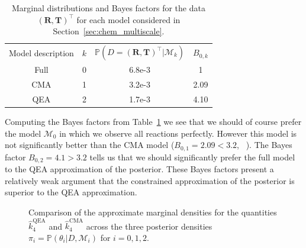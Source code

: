 \documentclass[final]{siamltex}
\begin{document}
\begin{table}[!htb]
\centering
\begin{tabular}{cccc}
	\toprule
	Model description & $k$ & \quad $\mathbb{P}(D =
                                  (\mathbf{R},\mathbf{T})^\top|\mathcal{M}_k)$
  & $B_{0,k}$ \\ \cmidrule(lr){1-4}
	Full & 0 & 6.8e-3 & 1 \\
	CMA & 1 & 3.2e-3 & 2.09 \\
	QEA & 2 & 1.7e-3 & 4.10 \\ \bottomrule
\end{tabular}
\caption{Marginal distributions and Bayes factors for the data $(\mathbf{R},\mathbf{T})^\top$ for each model considered in Section~\ref{sec:chem_multiscale}.}
\label{tab:chem_Bayes_marginals}
\end{table}

Computing the Bayes factors from Table~\ref{tab:chem_Bayes_marginals}
we see that we should of course prefer the model $\mathcal{M}_0$ in
which we observe all reactions perfectly. However this model is not
significantly better than the CMA model ($B_{0,1} = 2.09 < 3.2$,
~\cite{kass1995bayes}). The Bayes factor $B_{0,2} = 4.1 > 3.2$ tells
us that we should significantly prefer the full model to the QEA
approximation of the posterior. These Bayes factors present a
relatively weak
argument that the constrained approximation of the posterior is
superior to the QEA approximation. 

\begin{figure}[!htb]
\centering
{}
\caption{Comparison of the approximate marginal densities for the
  quantities $\hat{k}_4^{\text{QEA}}$ and $\hat{k}_4^{\text{CMA}}$
  across the three posterior densities $\pi_i = \mathbb{P}(\theta_i|D,\mathcal{M}_i)$ for $i = 0, 1, 2$.}
\label{fig:chem_model_comp}
\end{figure}
\end{document}

